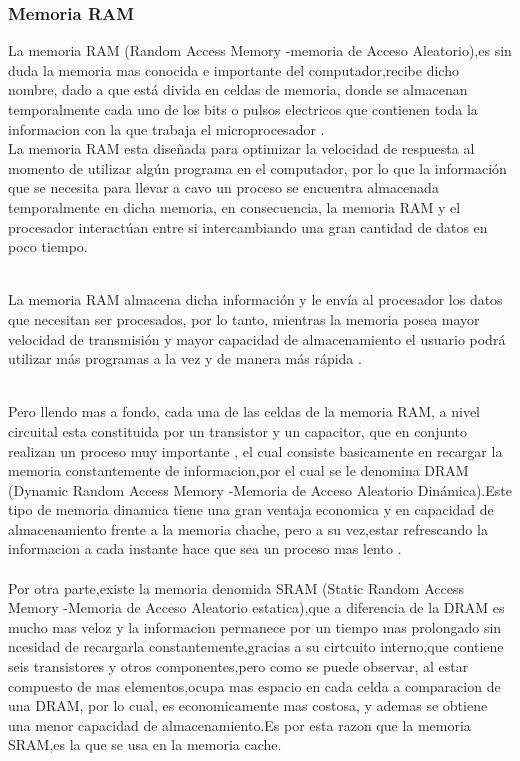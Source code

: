 \documentclass{article}
\begin{document}
\subsubsection{Memoria RAM}
La memoria RAM (Random Access Memory -memoria de Acceso Aleatorio),es sin duda la memoria mas conocida e importante del computador,recibe dicho nombre, dado a  que está divida en celdas de memoria, donde se almacenan temporalmente cada uno de los bits o pulsos electricos que contienen toda la informacion con la que trabaja el microprocesador \cite{augusto}.\\

La memoria RAM esta diseñada para optimizar la velocidad de respuesta al momento de utilizar algún
programa en el computador, por lo que  la información que se  necesita para llevar a cavo un proceso  se encuentra almacenada temporalmente en dicha memoria,  en consecuencia, la memoria RAM y el procesador interactúan entre si intercambiando una gran cantidad de datos en poco tiempo.\\\

La memoria RAM almacena dicha información y le envía al procesador los datos que necesitan
ser procesados, por lo tanto, mientras la memoria posea mayor velocidad de transmisión y
mayor capacidad de almacenamiento el usuario podrá utilizar más programas a la vez y de
manera más rápida \cite{apuntes}.\\\

Pero llendo mas a fondo, cada una de las celdas de la memoria RAM, a nivel circuital esta constituida por un transistor y un capacitor, que en conjunto realizan un proceso muy importante , el cual consiste basicamente en recargar la memoria constantemente de informacion,por el cual se le denomina DRAM (Dynamic Random Access Memory -Memoria de Acceso Aleatorio Dinámica).Este tipo de memoria dinamica tiene una gran ventaja economica y en capacidad de almacenamiento frente a la memoria chache, pero a su vez,estar refrescando la informacion a cada instante hace que sea un proceso mas  lento \cite{augusto}.\\\\

Por otra parte,existe la memoria denomida SRAM (Static Random Access Memory -Memoria de Acceso Aleatorio estatica),que a diferencia de la DRAM es mucho mas veloz y la informacion permanece por un tiempo mas prolongado sin ncesidad de recargarla constantemente,gracias a su cirtcuito interno,que contiene seis transistores y otros componentes,pero como se puede observar, al estar compuesto de mas elementos,ocupa mas espacio en cada celda a comparacion de una DRAM, por lo cual, es economicamente mas costosa, y ademas se obtiene una menor capacidad de almacenamiento.Es por esta razon que la memoria SRAM,es la que se usa en la memoria cache.
\end{document}
